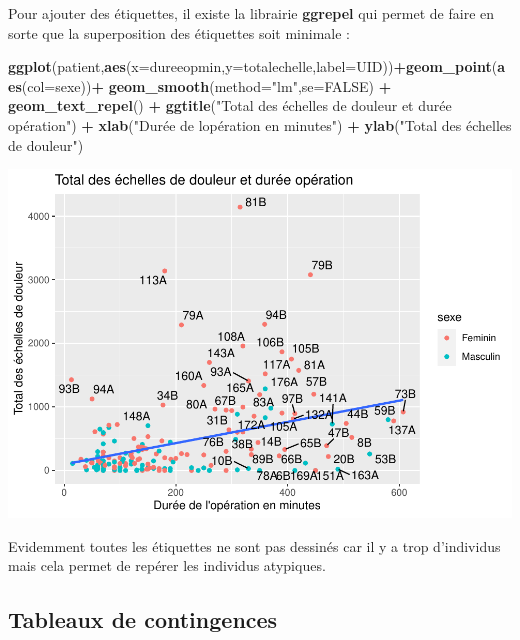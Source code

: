 \documentclass[
]{book}
\newenvironment{Shaded}{\begin{snugshade}}{\end{snugshade}}
\newcommand{\AttributeTok}[1]{\textcolor[rgb]{0.13,0.29,0.53}{#1}}
\newcommand{\ConstantTok}[1]{\textcolor[rgb]{0.56,0.35,0.01}{#1}}
\newcommand{\FunctionTok}[1]{\textcolor[rgb]{0.13,0.29,0.53}{\textbf{#1}}}
\newcommand{\NormalTok}[1]{#1}
\newcommand{\SpecialCharTok}[1]{\textcolor[rgb]{0.81,0.36,0.00}{\textbf{#1}}}
\newcommand{\StringTok}[1]{\textcolor[rgb]{0.31,0.60,0.02}{#1}}
\begin{document}
Pour ajouter des étiquettes, il existe la librairie \textbf{ggrepel} qui permet
de faire en sorte que la superposition des étiquettes soit minimale :

\begin{Shaded}
\begin{Highlighting}[]
\FunctionTok{ggplot}\NormalTok{(patient,}\FunctionTok{aes}\NormalTok{(}\AttributeTok{x=}\NormalTok{dureeopmin,}\AttributeTok{y=}\NormalTok{totalechelle,}\AttributeTok{label=}\NormalTok{UID))}\SpecialCharTok{+}\FunctionTok{geom\_point}\NormalTok{(}\FunctionTok{aes}\NormalTok{(}\AttributeTok{col=}\NormalTok{sexe))}\SpecialCharTok{+}
  \FunctionTok{geom\_smooth}\NormalTok{(}\AttributeTok{method=}\StringTok{"lm"}\NormalTok{,}\AttributeTok{se=}\ConstantTok{FALSE}\NormalTok{) }\SpecialCharTok{+}
  \FunctionTok{geom\_text\_repel}\NormalTok{() }\SpecialCharTok{+}
  \FunctionTok{ggtitle}\NormalTok{(}\StringTok{"Total des échelles de douleur et durée opération"}\NormalTok{) }\SpecialCharTok{+} 
  \FunctionTok{xlab}\NormalTok{(}\StringTok{"Durée de l\textquotesingle{}opération en minutes"}\NormalTok{) }\SpecialCharTok{+} 
  \FunctionTok{ylab}\NormalTok{(}\StringTok{"Total des échelles de douleur"}\NormalTok{) }
\end{Highlighting}
\end{Shaded}

\includegraphics{_main_files/figure-latex/ggplot21-1.pdf}

Evidemment toutes les étiquettes ne sont pas dessinés car il y a trop d'individus
mais cela permet de repérer les individus atypiques.

\hypertarget{tableaux-de-contingences}{%
\subsection{Tableaux de contingences}\label{tableaux-de-contingences}}
\end{document}
